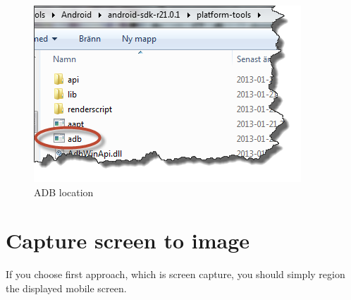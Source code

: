    \begin{figure}[H]
		\centering
		\includegraphics[scale=0.65]{Chapters/Fig/adb.png}
		\caption{ADB location}
		\label{fig:adb}
	\end{figure}
    
\section{Capture screen to image}
If you choose first approach, which is screen capture, you should simply region the displayed mobile screen. 